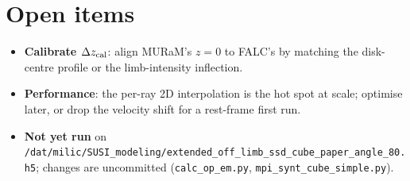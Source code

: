 \documentclass[10pt]{article}
\newcommand{\code}[1]{\texttt{\small #1}}
\begin{document}
\section{Open items}
\begin{itemize}
  \item \textbf{Calibrate $\Delta z_{\rm cal}$}: align MURaM's $z=0$ to FALC's by
    matching the disk-centre profile or the limb-intensity inflection.
  \item \textbf{Performance}: the per-ray 2D interpolation is the hot spot at scale;
    optimise later, or drop the velocity shift for a rest-frame first run.
  \item \textbf{Not yet run} on
    \code{/dat/milic/SUSI\_modeling/extended\_off\_limb\_ssd\_cube\_paper\_angle\_80.h5};
    changes are uncommitted (\code{calc\_op\_em.py}, \code{mpi\_synt\_cube\_simple.py}).
\end{itemize}
\end{document}
